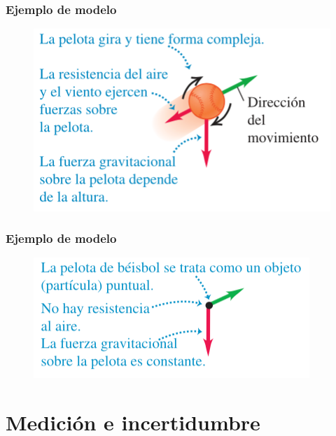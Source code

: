\begin{frame}
\frametitle{Ejemplo de modelo}
\begin{figure}
    \centering
    \includegraphics[scale=0.75]{./Imagenes/Modelo_Bola_01.png}
\end{figure}
\end{frame}
\begin{frame}
\frametitle{Ejemplo de modelo}
\begin{figure}
    \centering
    \includegraphics[scale=0.75]{./Imagenes/Modelo_Bola_02.png}
\end{figure}
\end{frame}
\section{Medición e incertidumbre}
